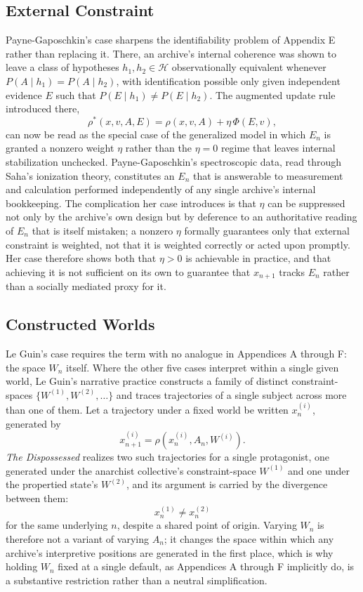 \documentclass[11pt]{article}
\begin{document}
\subsection*{External Constraint}

Payne-Gaposchkin's case sharpens the identifiability problem of Appendix E rather than replacing it. There, an archive's internal coherence was shown to leave a class of hypotheses $h_1, h_2 \in \mathcal{H}$ observationally equivalent whenever $P(A \mid h_1) = P(A \mid h_2)$, with identification possible only given independent evidence $E$ such that $P(E \mid h_1) \neq P(E \mid h_2)$. The augmented update rule introduced there,
\[
\rho^\ast(x, v, A, E) = \rho(x, v, A) + \eta\, \Phi(E, v),
\]
can now be read as the special case of the generalized model in which $E_n$ is granted a nonzero weight $\eta$ rather than the $\eta = 0$ regime that leaves internal stabilization unchecked. Payne-Gaposchkin's spectroscopic data, read through Saha's ionization theory, constitutes an $E_n$ that is answerable to measurement and calculation performed independently of any single archive's internal bookkeeping. The complication her case introduces is that $\eta$ can be suppressed not only by the archive's own design but by deference to an authoritative reading of $E_n$ that is itself mistaken; a nonzero $\eta$ formally guarantees only that external constraint is weighted, not that it is weighted correctly or acted upon promptly. Her case therefore shows both that $\eta > 0$ is achievable in practice, and that achieving it is not sufficient on its own to guarantee that $x_{n+1}$ tracks $E_n$ rather than a socially mediated proxy for it.

\subsection*{Constructed Worlds}

Le Guin's case requires the term with no analogue in Appendices A through F: the space $W_n$ itself. Where the other five cases interpret within a single given world, Le Guin's narrative practice constructs a family of distinct constraint-spaces $\{W^{(1)}, W^{(2)}, \ldots\}$ and traces trajectories of a single subject across more than one of them. Let a trajectory under a fixed world be written $x^{(i)}_n$, generated by
\[
x^{(i)}_{n+1} = \rho\!\left(x^{(i)}_n, A_n, W^{(i)}\right).
\]
\emph{The Dispossessed} realizes two such trajectories for a single protagonist, one generated under the anarchist collective's constraint-space $W^{(1)}$ and one under the propertied state's $W^{(2)}$, and its argument is carried by the divergence between them:
\[
x^{(1)}_n \neq x^{(2)}_n
\]
for the same underlying $n$, despite a shared point of origin. Varying $W_n$ is therefore not a variant of varying $A_n$; it changes the space within which any archive's interpretive positions are generated in the first place, which is why holding $W_n$ fixed at a single default, as Appendices A through F implicitly do, is a substantive restriction rather than a neutral simplification.
\end{document}
